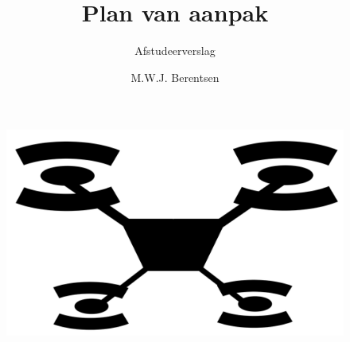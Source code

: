 \documentclass[a4paper, 11pt, oneside]{report}
\author{M.W.J. Berentsen}
\title{Plan van aanpak}
\subtitle{Afstudeerverslag}{HAN Arnhem}{561399}{MWJ.Berentsen@student.han.nl}{Versie 1}{Alten Nederland B.V.}{Docent: ir. J. Visch}{Assessor: ir. C.G.R. van Uffelen}
\begin{document}
\begin{figure}
\begin{center}\includegraphics[scale=0.15]{pf}\end{center}
\end{figure}
\maketitle



\tableofcontents
\clearpage


\end{document}
